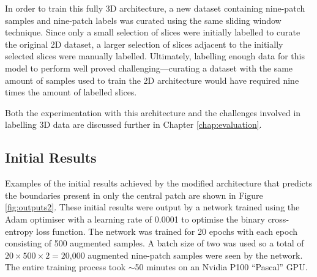 In order to train this fully 3D architecture, a new dataset containing nine-patch samples and nine-patch labels was curated using the same sliding window technique. Since only a small selection of slices were initially labelled to curate the original 2D dataset, a larger selection of slices adjacent to the initially selected slices were manually labelled. Ultimately, labelling enough data for this model to perform well proved challenging---curating a dataset with the same amount of samples used to train the 2D architecture would have required nine times the amount of labelled slices.

Both the experimentation with this architecture and the challenges involved in labelling 3D data are discussed further in Chapter \ref{chap:evaluation}.

\subsection{Initial Results}

Examples of the initial results achieved by the modified architecture that predicts the boundaries present in only the central patch are shown in Figure \ref{fig:outputs2}. These initial results were output by a network trained using the Adam optimiser with a learning rate of 0.0001 to optimise the binary cross-entropy loss function. The network was trained for 20 epochs with each epoch consisting of 500 augmented samples. A batch size of two was used so a total of $20\times500\times2=\text{20,000}$ augmented nine-patch samples were seen by the network. The entire training process took ${\sim}$50 minutes on an Nvidia P100 ``Pascal'' GPU.

